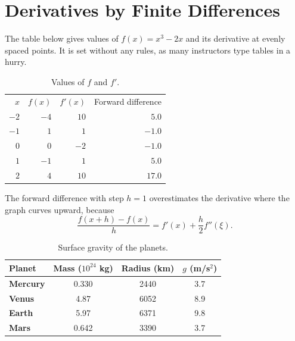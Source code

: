 \documentclass[11pt]{article}
\begin{document}
\clearpage
\section*{Derivatives by Finite Differences}

The table below gives values of $f(x) = x^3 - 2x$ and its derivative at evenly spaced
points. It is set without any rules, as many instructors type tables in a hurry.

\begin{table}[h]
\centering
\caption{Values of $f$ and $f'$.}
\label{tab:values}
\begin{tabular}{rrrr}
$x$ & $f(x)$ & $f'(x)$ & Forward difference \\[4pt]
$-2$ & $-4$ & $10$ & $5.0$ \\
$-1$ & $1$ & $1$ & $-1.0$ \\
$0$ & $0$ & $-2$ & $-1.0$ \\
$1$ & $-1$ & $1$ & $5.0$ \\
$2$ & $4$ & $10$ & $17.0$ \\
\end{tabular}
\end{table}

The forward difference with step $h = 1$ overestimates the derivative where the graph
curves upward, because
\begin{equation}
  \frac{f(x+h) - f(x)}{h} = f'(x) + \frac{h}{2} f''(\xi).
\end{equation}

\begin{table}[h]
\centering
\caption{Surface gravity of the planets.}
\label{tab:planets}
\begin{tabular}{>{\bfseries}lccc}
\toprule
\textbf{Planet} & \textbf{Mass ($10^{24}$ kg)} & \textbf{Radius (km)} & \textbf{$g$ (m/s$^2$)} \\
\midrule
Mercury & 0.330 & 2440 & 3.7 \\
Venus & 4.87 & 6052 & 8.9 \\
Earth & 5.97 & 6371 & 9.8 \\
Mars & 0.642 & 3390 & 3.7 \\
\bottomrule
\end{tabular}
\end{table}
\end{document}
